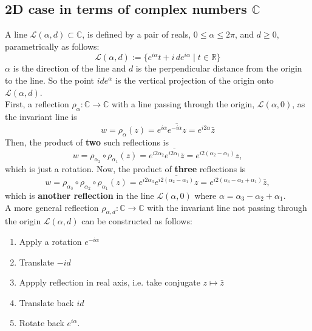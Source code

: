 \documentclass{article}
\begin{document}
\subsection{2D case in terms of complex numbers $\mathbb{C}$}
\label{sec-3-1}
A line $\mathcal{L}(\alpha, d) \subset \mathbb{C}$, is defined by a pair of reals, $0 \le \alpha \le 2\pi$, and $d \ge 0$, parametrically as follows:
\begin{equation}
\mathcal{L}(\alpha, d) := \{ e^{i\alpha}t + i \, d e^{i\alpha} \mid t \in \mathbb{R} \}
\end{equation}
$\alpha$ is the direction of the line and $d$ is the perpendicular distance from the origin to the line. So the point $i d e^{\alpha}$ is the vertical projection of the origin onto $\mathcal{L}(\alpha, d)$.\\
First, a reflection $\rho_{\alpha}:\mathbb{C} \rightarrow \mathbb{C}$ with a line passing through the origin, $\mathcal{L}(\alpha, 0)$, as the invariant line is
\begin{equation}
w = \rho_{\alpha} (z) = e^{i\alpha} \overline{e^{-i\alpha} z} = e^{i2\alpha} \bar{z}
\end{equation}
Then, the product of \textbf{two} such reflections is
\begin{equation}
w = \rho_{\alpha_{2}} \circ \rho_{\alpha_{1}} (z) = e^{i2\alpha_{2}} \overline{e^{i2\alpha_{1}} \bar{z}} = e^{i2(\alpha_{2} - \alpha_{1})} z,
\end{equation}
which is just a rotation. Now, the product of \textbf{three} reflections is
\begin{equation}
w = \rho_{\alpha_{3}} \circ \rho_{\alpha_{2}} \circ \rho_{\alpha_{1}} (z) = e^{i2\alpha_{3}} \overline{e^{i2(\alpha_{2} - \alpha_{1})} z} = e^{i2(\alpha_{3} - \alpha_{2} + \alpha_{1})} \bar{z},
\end{equation}
which is \textbf{another reflection} in the line $\mathcal{L}(\alpha, 0)$ where $\alpha = \alpha_{3} - \alpha_{2} + \alpha_{1}$.\\
A more general reflection $\rho_{\alpha,d}:\mathbb{C} \rightarrow \mathbb{C}$ with the invariant line not passing through the origin $\mathcal{L}(\alpha, d)$ can be constructed as follows:
\begin{enumerate}
\item Apply a rotation $e^{-i\alpha}$
\item Translate $-id$
\item Appply reflection in real axis, i.e. take conjugate $z \mapsto \bar{z}$
\item Translate back $id$
\item Rotate back $e^{i\alpha}$.
\end{enumerate}
\end{document}

